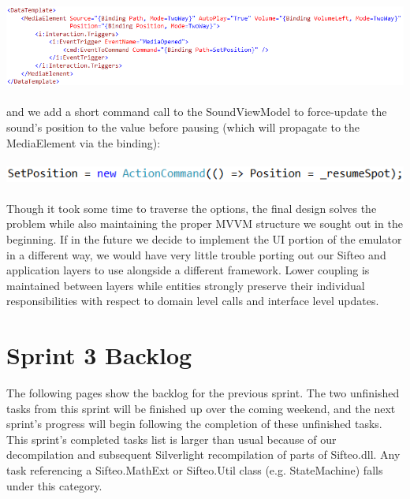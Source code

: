 \documentclass[12pt]{article}
\begin{document}
\includegraphics[scale=.65]{xamlCode.png} \\\\
and we add a short command call to the SoundViewModel to force-update the sound’s position to the value before pausing (which will propagate to the MediaElement via the binding): \\\\
\includegraphics[scale=.65]{commandCode.png} \\\\
Though it took some time to traverse the options, the final design solves the problem while also maintaining the proper MVVM structure we sought out in the beginning. If in the future we decide to implement the UI portion of the emulator in a different way, we would have very little trouble porting out our Sifteo and application layers to use alongside a different framework. Lower coupling is maintained between layers while entities strongly preserve their individual responsibilities with respect to domain level calls and interface level updates.

\section*{Sprint 3 Backlog}
The following pages show the backlog for the previous sprint. The two unfinished tasks from this sprint will be finished up over the coming weekend, and the next sprint's progress will begin following the completion of these unfinished tasks.\\

This sprint's completed tasks list is larger than usual because of our decompilation and subsequent Silverlight recompilation of parts of Sifteo.dll. Any task referencing a Sifteo.MathExt or Sifteo.Util class (e.g. StateMachine) falls under this category.


\end{document}
